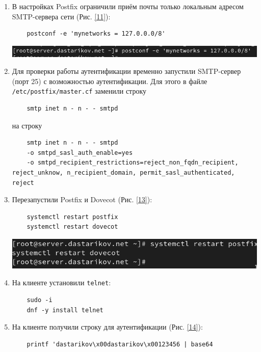 \begin{enumerate}
\item В настройках Postfix ограничили приём почты только локальным адресом SMTP-сервера сети (Рис. \ref{11}):
  \begin{verbatim}
    postconf -e 'mynetworks = 127.0.0.0/8'
  \end{verbatim}
\begin{center}
    \centering
    \includegraphics[width=\textwidth]{../images/image11.png}
    \label{11}
\end{center}
\item Для проверки работы аутентификации временно запустили SMTP-сервер (порт 25) с возможностью аутентификации. Для этого в файле \texttt{/etc/postfix/master.cf} заменили строку
  \begin{verbatim}
    smtp inet n - n - - smtpd
  \end{verbatim}
  на строку
  \begin{verbatim}
    smtp inet n - n - - smtpd
    -o smtpd_sasl_auth_enable=yes
    -o smtpd_recipient_restrictions=reject_non_fqdn_recipient, reject_unknow, n_recipient_domain, permit_sasl_authenticated, reject
  \end{verbatim}
\item Перезапустили Postfix и Dovecot (Рис. \ref{13}):
  \begin{verbatim}
    systemctl restart postfix
    systemctl restart dovecot
  \end{verbatim}
  \begin{center}
    \centering
    \includegraphics[width=\textwidth]{../images/image13.png}
    \label{13}
\end{center}
\item На клиенте установили \texttt{telnet}:
  \begin{verbatim}
    sudo -i
    dnf -y install telnet
  \end{verbatim}
\item На клиенте получили строку для аутентификации (Рис. \ref{14}):
  \begin{verbatim}
    printf 'dastarikov\x00dastarikov\x00123456 | base64

\end{verbatim}
\end{enumerate}
